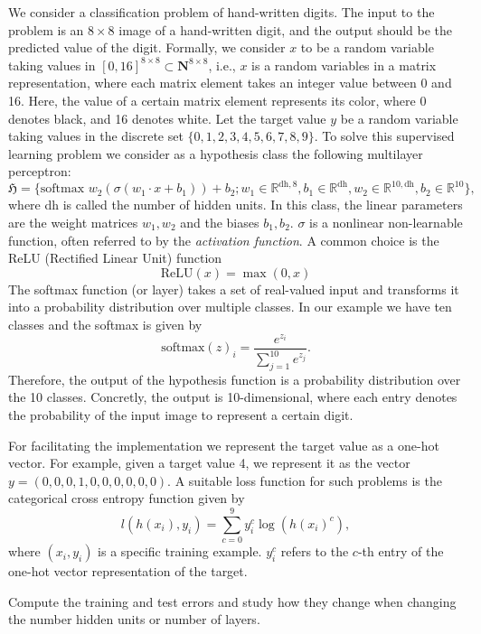 \begin{boxedexample}[Classification] \complementary{\theexample}
    \label{ex:classification}
    We consider a classification problem of hand-written digits. The input to
    the problem is an $8 \times 8$ image of a hand-written digit, and the output
    should be the predicted value of the digit. Formally, we consider $x$ to be a
    random variable taking values in $[0, 16]^{8 \times 8} \subset
    \mathbf{N}^{8 \times 8}$, i.e., $x$ is a random variables in a matrix
    representation, where each matrix element takes an integer value between 0
    and 16. Here, the value of a certain matrix element represents its color,
    where 0 denotes black, and 16 denotes white. Let the target value $y$ be a
    random variable taking values in the discrete set $\{0,1,2,3,4,5,6,7,8,9\}$.
    To solve this supervised learning problem we consider as a hypothesis class
    the following multilayer perceptron:
    \begin{equation*}
        \mathfrak{H} = \bigl\{\text{softmax } w_2 \left(\sigma (w_1 \cdot x + b_1 ) \right) + b_2 ; w_1 \in \mathbb{R}^{\text{dh}, 8}, b_1 \in \mathbb{R}^{\text{dh}}, w_2 \in \mathbb{R}^{10, \text{dh}}, b_2 \in \mathbb{R}^{10}   \bigr\},
    \end{equation*}
    where dh is called the number of hidden units. In this class, the linear
    parameters are the weight matrices $w_1, w_2$ and the biases $b_1, b_2$.
    $\sigma$ is a nonlinear non-learnable function, often referred to by the \emph{activation function}. A common choice
    is the ReLU (Rectified Linear Unit) function
    \begin{equation*}
        \text{ReLU}(x) = \max(0, x)    
    \end{equation*}
 The softmax function (or layer) takes a set of real-valued input  and
 transforms it into a probability distribution over multiple classes. In our
 example we have ten classes and the softmax is given by
    \begin{equation*}
        \text{softmax}(z)_i = \frac{e^{z_i}}{\sum_{j=1}^{10} e^{z_j}}.
    \end{equation*}
    Therefore, the output of the hypothesis function is a probability distribution
    over the 10 classes. Concretly, the output is 10-dimensional, where each entry
    denotes the probability of the input image to represent a certain digit. 
    
    For facilitating the implementation we represent the target value as a one-hot
    vector. For example, given a target value 4, we represent it as the vector $y =
    (0,0,0,1,0,0,0,0,0,0)$. A suitable loss function for such problems is the
    categorical cross
    entropy
    function given by 
    \begin{equation*}
        l(h(x_i), y_i) = \sum_{c=0}^9 y_{i}^c \log(h(x_i)^c),
    \end{equation*}
    where $(x_i, y_i)$ is a specific training example. $y_{i}^c$ refers to the
    $c$-th entry of the one-hot vector representation of the target.

    Compute the training and test errors and study how they change when changing
    the number hidden units or number of layers.
\end{boxedexample}
  
